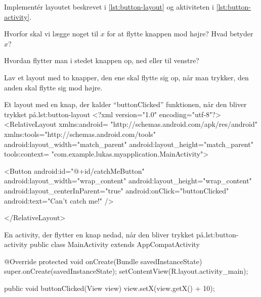 \begin{exercise}
	Implementér layoutet beskrevet i \autoref{lst:button-layout} og aktiviteten 
	i \autoref{lst:button-activity}.
\end{exercise}

\begin{exercise}
	Hvorfor skal vi lægge noget til $x$ for at flytte knappen mod højre? Hvad 
	betyder $x$?
\end{exercise}

\begin{exercise}
	Hvordan flytter man i stedet knappen op, ned eller til venstre?
\end{exercise}

\begin{exercise}
	Lav et layout med to knapper, den ene skal flytte sig op, når man trykker, 
	den anden skal flytte sig mod højre.
\end{exercise}

\clearpage


\begin{XmlCode}{Et layout med en knap, der kalder ``buttonClicked'' funktionen, %
når den bliver trykket på.}{lst:button-layout}
	<?xml version="1.0" encoding="utf-8"?>
	<RelativeLayout 
		xmlns:android=
			"http://schemas.android.com/apk/res/android"
		xmlns:tools="http://schemas.android.com/tools"
		android:layout_width="match_parent"
		android:layout_height="match_parent"
		tools:context=
			"com.example.lukas.myapplication.MainActivity">
	
	<Button
		android:id="@+id/catchMeButton"
		android:layout_width="wrap_content"
		android:layout_height="wrap_content"
		android:layout_centerInParent="true"
		android:onClick="buttonClicked"
		android:text="Can't catch me!" />
		
	</RelativeLayout>
\end{XmlCode}

\clearpage

\begin{JavaCode}{En activity, der flytter en knap nedad, når den bliver trykket %
på.}{lst:button-activity}
	public class MainActivity extends AppCompatActivity {
		
		@Override
		protected void onCreate(Bundle savedInstanceState) {
			super.onCreate(savedInstanceState);
			setContentView(R.layout.activity_main);
		}
		
		
		public void buttonClicked(View view) {
			view.setX(view.getX() + 10);
		}
	}
\end{JavaCode}


